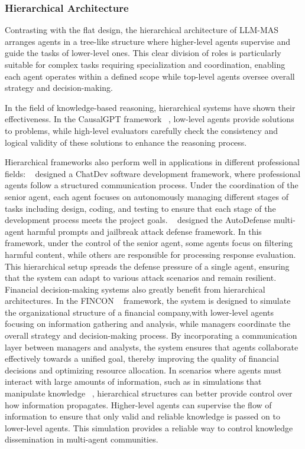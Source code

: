 \subsubsection{Hierarchical Architecture}

Contrasting with the flat design, the hierarchical architecture of LLM-MAS arranges agents in a tree-like structure where higher-level agents supervise and guide the tasks of lower-level ones. This clear division of roles is particularly suitable for complex tasks requiring specialization and coordination, enabling each agent operates within a defined scope while top-level agents oversee overall strategy and decision-making.

In the field of knowledge-based reasoning, hierarchical systems have shown their effectiveness. In the CausalGPT framework ~\cite{casualgpt_reasoning}, low-level agents provide solutions to problems, while high-level evaluators carefully check the consistency and logical validity of these solutions to enhance the reasoning process.

Hierarchical frameworks also perform well in applications in different professional fields: ~\cite{chatdev_software_development} designed a ChatDev software development framework, where professional agents follow a structured communication process. Under the coordination of the senior agent, each agent focuses on autonomously managing different stages of tasks including design, coding, and testing to ensure that each stage of the development process meets the project goals. 
~\cite{autodefense_against_jailbreak} designed the AutoDefense multi-agent harmful prompts and jailbreak attack defense framework. In this framework, under the control of the senior agent, some agents focus on filtering harmful content, while others are responsible for processing response evaluation. This hierarchical setup spreads the defense pressure of a single agent, ensuring that the system can adapt to various attack scenarios and remain resilient. 
Financial decision-making systems also greatly benefit from hierarchical architectures. In the FINCON ~\cite{fincon_decision_making} framework, the system is designed to simulate the organizational structure of a financial company,with lower-level agents focusing on information gathering and analysis, while managers coordinate the overall strategy and decision-making process. By incorporating a communication layer between managers and analysts, the system ensures that agents collaborate effectively towards a unified goal, thereby improving the quality of financial decisions and optimizing resource allocation. 
In scenarios where agents must interact with large amounts of information, such as in simulations that manipulate knowledge ~\cite{community_knowledge_flooding}, hierarchical structures can better provide control over how information propagates. Higher-level agents can supervise the flow of information to ensure that only valid and reliable knowledge is passed on to lower-level agents. This simulation provides a reliable way to control knowledge dissemination in multi-agent communities.


